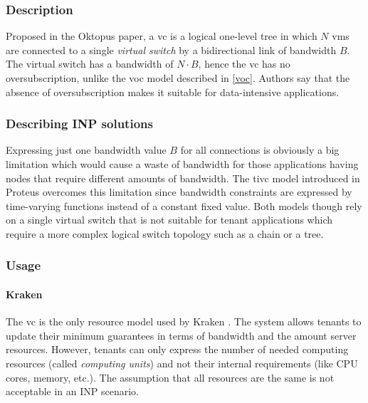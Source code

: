 
\subsubsection{Description}
Proposed in the Oktopus \cite{oktopus} paper, a \gls{vc} is a logical one-level tree in which $N$ \glspl{vm} are connected to a single \textit{virtual switch} by a bidirectional link of bandwidth $B$.
The virtual switch has a bandwidth of $N \cdot B$, hence the \gls{vc} has no oversubscription, unlike the \gls{voc} model described in \autoref{voc}.
Authors say that the absence of oversubscription makes it suitable for data-intensive applications.

\subsubsection{Describing INP solutions}
Expressing just one bandwidth value $B$ for all connections is obviously a big limitation which would cause a waste of bandwidth for those applications having nodes that require different amounts of bandwidth.
The \gls{tivc} model introduced in Proteus \cite{proteus} overcomes this limitation since bandwidth constraints are expressed by time-varying functions instead of a constant fixed value.
Both models though rely on a single virtual switch that is not suitable for tenant applications which require a more complex logical switch topology such as a chain or a tree.

\subsubsection{Usage}
\paragraph{Kraken \texorpdfstring{\cite{kraken}}{}}
The \gls{vc} is the only resource model used by Kraken \cite{kraken}.
The system allows tenants to update their minimum guarantees in terms of bandwidth and the amount server resources.
However, tenants can only express the number of needed computing resources (called \textit{computing units}) and not their internal requirements (like CPU cores, memory, etc.).
The assumption that all resources are the same is not acceptable in an INP scenario.

